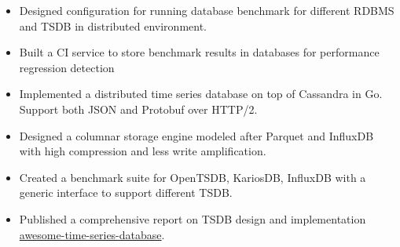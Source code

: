 \documentclass[11pt, letterpaper]{simple-cv}
\begin{document}


\begin{itemize}
	\item Designed configuration for running database benchmark for different RDBMS and TSDB in distributed environment.
	\item Built a CI service to store benchmark results in databases for performance regression detection
\end{itemize}


\begin{itemize}
	\item Implemented a distributed time series database on top of Cassandra in Go. Support both JSON and Protobuf over HTTP/2.
	\item Designed a columnar storage engine modeled after Parquet and InfluxDB with high compression and less write amplification.
	\item Created a benchmark suite for OpenTSDB, KariosDB, InfluxDB with a generic interface to support different TSDB.
	\item Published a comprehensive report on TSDB design and implementation \href{https://xephonhq.github.io/awesome-time-series-database}{awesome-time-series-database}.
\end{itemize}


\end{document}
